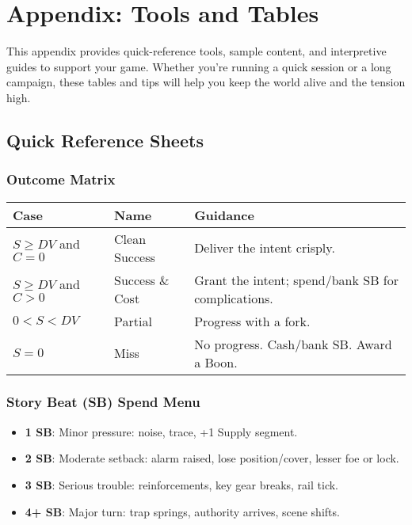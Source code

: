 \chapter{Appendix: Tools and Tables}

This appendix provides quick-reference tools, sample content, and interpretive guides to support your game. Whether you're running a quick session or a long campaign, these tables and tips will help you keep the world alive and the tension high.

\section*{Quick Reference Sheets}

\subsection*{Outcome Matrix}

\begin{center}
\begin{tabular}{lll}
\toprule
\textbf{Case} & \textbf{Name} & \textbf{Guidance} \\
\midrule
$S \geq DV$ and $C = 0$ & Clean Success\index{Clean Success} & Deliver the intent crisply. \\
$S \geq DV$ and $C > 0$ & Success \& Cost\index{Success \& Cost} & Grant the intent; spend/bank SB for complications. \\
$0 < S < DV$ & Partial\index{Partial} & Progress with a fork. \\
$S = 0$ & Miss\index{Miss} & No progress. Cash/bank SB. Award a Boon. \\
\bottomrule
\end{tabular}
\end{center}

\subsection*{Story Beat (SB) Spend Menu}

\begin{itemize}
    \item \textbf{1 SB}: Minor pressure: noise, trace, +1 Supply segment.
    \item \textbf{2 SB}: Moderate setback: alarm raised, lose position/cover, lesser foe or lock.
    \item \textbf{3 SB}: Serious trouble: reinforcements, key gear breaks, rail tick.
    \item \textbf{4+ SB}: Major turn: trap springs, authority arrives, scene shifts.
\end{itemize}

